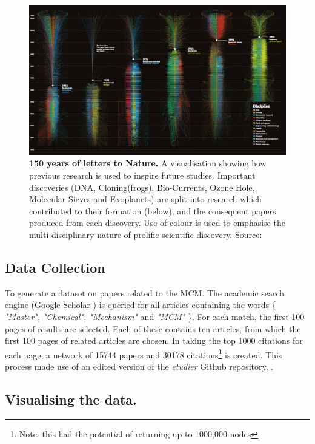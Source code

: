 \begin{figure}[H]
     \centering
         \includegraphics[width=0.92\textheight,angle=90]{figures_c3/naturegraph.png}

        \caption{\textbf{150 years of letters to Nature.} A visualisation showing how previous research is used to inspire future studies. Important discoveries (DNA, Cloning(frogs), Bio-Currents, Ozone Hole, Molecular Sieves and Exoplanets) are split into research which contributed to their formation (below), and the consequent papers produced from each discovery. Use of colour is used to emphasise the multi-disciplinary nature of prolific scientific discovery. Source: \citep{naturecover}}
        \label{fig:naturecover}
\end{figure}



\subsection{Data Collection}\label{sec:scholar}

To generate a dataset on papers related to the MCM. The academic search engine (Google Scholar \citep{scholar}) is queried for all articles containing the words \{ \emph{"Master", "Chemical", "Mechanism"} and \emph{"MCM"} \}. For each match, the first 100 pages of results are selected. Each of these contains ten articles, from which the first 100 pages of related articles are chosen.
In taking the top 1000 citations for each page, a network of 15744 papers and 30178 citations\footnote{Note: this had the potential of returning up to 1000,000 nodes} is created. This process made use of an edited version of the  \emph{etudier} Github repository, \citep{web}.


\subsection{Visualising the data.}

